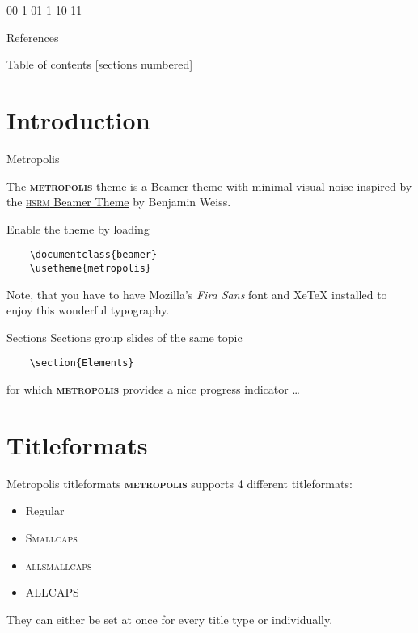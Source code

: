 \documentclass[10pt]{beamer}
\newcommand{\themename}{\textbf{\textsc{metropolis}}\xspace}
\begin{document}
00 1
01 1
10 
11
\begin{frame}[allowframebreaks]{References}
	
	
	
	
\end{frame}


\iffalse

\begin{frame}{Table of contents}
  [sections numbered]
  \tableofcontents%
\end{frame}

\section[Intro]{Introduction}

\begin{frame}[fragile]{Metropolis}

  The \themename theme is a Beamer theme with minimal visual noise
  inspired by the \href{https://github.com/hsrmbeamertheme/hsrmbeamertheme}{\textsc{hsrm} Beamer
  Theme} by Benjamin Weiss.

  Enable the theme by loading

  \begin{verbatim}    \documentclass{beamer}
    \usetheme{metropolis}\end{verbatim}

  Note, that you have to have Mozilla's \emph{Fira Sans} font and XeTeX
  installed to enjoy this wonderful typography.
\end{frame}
\begin{frame}[fragile]{Sections}
  Sections group slides of the same topic

  \begin{verbatim}    \section{Elements}\end{verbatim}

  for which \themename provides a nice progress indicator \ldots
  
\end{frame}

\section{Titleformats}

\begin{frame}{Metropolis titleformats}
	\themename supports 4 different titleformats:
	\begin{itemize}
		\item Regular
		\item \textsc{Smallcaps}
		\item \textsc{allsmallcaps}
		\item ALLCAPS
	\end{itemize}
	They can either be set at once for every title type or individually.
\end{frame}
\end{document}
